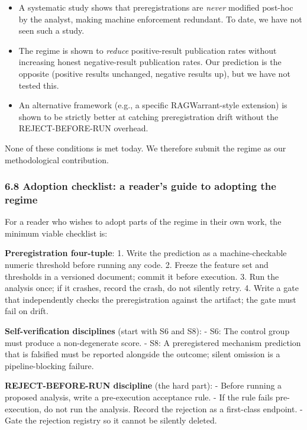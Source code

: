 \documentclass[
]{article}
\providecommand{\tightlist}{%
  \setlength{\itemsep}{0pt}\setlength{\parskip}{0pt}}
\begin{document}
\begin{itemize}
\tightlist
\item
  A systematic study shows that preregistrations are \emph{never}
  modified post-hoc by the analyst, making machine enforcement
  redundant. To date, we have not seen such a study.
\item
  The regime is shown to \emph{reduce} positive-result publication rates
  without increasing honest negative-result publication rates. Our
  prediction is the opposite (positive results unchanged, negative
  results up), but we have not tested this.
\item
  An alternative framework (e.g., a specific RAGWarrant-style extension)
  is shown to be strictly better at catching preregistration drift
  without the REJECT-BEFORE-RUN overhead.
\end{itemize}

None of these conditions is met today. We therefore submit the regime as
our methodological contribution.

\subsubsection{6.8 Adoption checklist: a reader's guide to adopting the
regime}\label{adoption-checklist-a-readers-guide-to-adopting-the-regime}

For a reader who wishes to adopt parts of the regime in their own work,
the minimum viable checklist is:

\textbf{Preregistration four-tuple}: 1. Write the prediction as a
machine-checkable numeric threshold before running any code. 2. Freeze
the feature set and thresholds in a versioned document; commit it before
execution. 3. Run the analysis once; if it crashes, record the crash, do
not silently retry. 4. Write a gate that independently checks the
preregistration against the artifact; the gate must fail on drift.

\textbf{Self-verification disciplines} (start with S6 and S8): - S6: The
control group must produce a non-degenerate score. - S8: A preregistered
mechanism prediction that is falsified must be reported alongside the
outcome; silent omission is a pipeline-blocking failure.

\textbf{REJECT-BEFORE-RUN discipline} (the hard part): - Before running
a proposed analysis, write a pre-execution acceptance rule. - If the
rule fails pre-execution, do not run the analysis. Record the rejection
as a first-class endpoint. - Gate the rejection registry so it cannot be
silently deleted.
\end{document}
